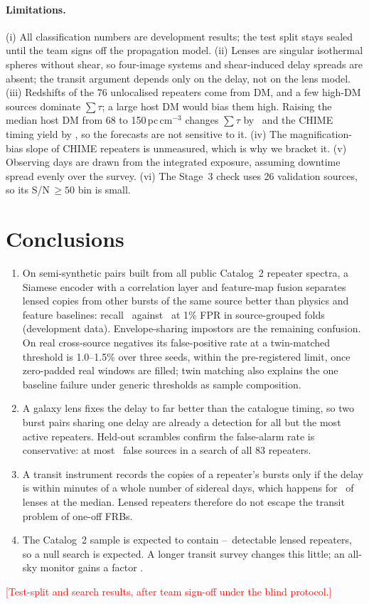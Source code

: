 \documentclass[fleqn,usenatbib]{mnras}
\newcommand{\pending}[1]{\textcolor{red}{[#1]}}
\begin{document}
\paragraph*{Limitations.}
(i) All classification numbers are development results; the test split stays sealed until the team signs off the
propagation model. (ii) Lenses are singular isothermal spheres without shear, so four-image systems and shear-induced
delay spreads are absent; the transit argument depends only on the delay, not on the lens model. (iii) Redshifts of the 76
unlocalised repeaters come from DM, and a few high-DM sources dominate $\sum\tau$; a large host DM would bias them high.
Raising the median host DM from 68 to 150\,pc\,cm$^{-3}$ changes $\sum\tau$ by \HostSensTau\ and the CHIME timing yield by
\HostSens, so the forecasts are not sensitive to it. (iv) The magnification-bias slope of CHIME repeaters is unmeasured, which is why we bracket it.
(v) Observing days are drawn from the integrated exposure, assuming downtime spread evenly over the survey.
(vi) The Stage~3 check uses 26 validation sources, so its S/N\,$\ge50$ bin is small.

\section{Conclusions}
\begin{enumerate}
\item On semi-synthetic pairs built from all public Catalog~2 repeater spectra, a Siamese encoder with a correlation
layer and feature-map fusion separates lensed copies from other bursts of the same source better than physics and feature
baselines: recall \RecallMsixOOF\ against \RecallGBMOOF\ at 1\% FPR in source-grouped folds (development data).
Envelope-sharing impostors are the remaining confusion. On real cross-source negatives its false-positive rate at a
twin-matched threshold is 1.0--1.5\% over three seeds, within the pre-registered limit, once zero-padded real windows are
filled; twin matching also explains the one baseline failure under generic thresholds as sample composition.
\item A galaxy lens fixes the delay to far better than the catalogue timing, so two burst pairs sharing one delay are
already a detection for all but the most active repeaters. Held-out scrambles confirm the false-alarm rate is
conservative: at most \FarSearchUp\ false sources in a search of all 83 repeaters.
\item A transit instrument records the copies of a repeater's bursts only if the delay is within minutes of a whole
number of sidereal days, which happens for \PalignMedian\ of lenses at the median. Lensed repeaters therefore do not
escape the transit problem of one-off FRBs.
\item The Catalog~2 sample is expected to contain \NexpCHIME--\NexpCHIMEbias\ detectable lensed repeaters, so a null
search is expected. A longer transit survey changes this little; an all-sky monitor gains a factor \GainAllSky.
\end{enumerate}
\pending{Test-split and search results, after team sign-off under the blind protocol.}
\end{document}
